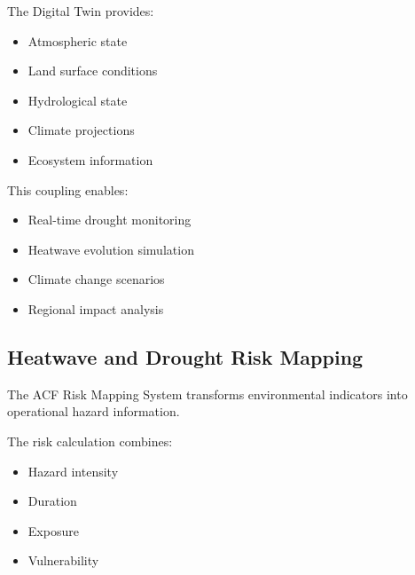 The Digital Twin provides:

\begin{itemize}

\item Atmospheric state

\item Land surface conditions

\item Hydrological state

\item Climate projections

\item Ecosystem information

\end{itemize}


This coupling enables:

\begin{itemize}

\item Real-time drought monitoring

\item Heatwave evolution simulation

\item Climate change scenarios

\item Regional impact analysis

\end{itemize}


\subsection{Heatwave and Drought Risk Mapping}

The ACF Risk Mapping System transforms environmental indicators into
operational hazard information.

The risk calculation combines:

\begin{itemize}

\item Hazard intensity

\item Duration

\item Exposure

\item Vulnerability

\end{itemize}


